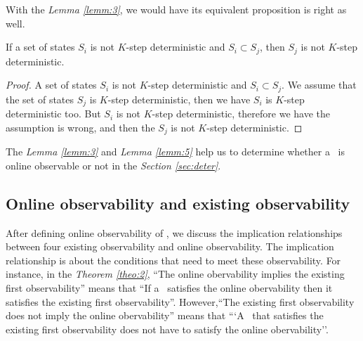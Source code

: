 With the {\em Lemma \ref{lemm:3}}, we would have its equivalent proposition is right as well.
\begin{lemma}
 If a set of states $S_i$ is not $K$-step deterministic and $S_i\subset S_j$, then $S_j$ is not $K$-step deterministic. 
  \label{lemm:5}
\end{lemma}
\begin{proof}
A set of states $S_i$ is not $K$-step deterministic and $S_i\subset S_j$. We assume that the set of states $S_j$ is $K$-step deterministic, then we have $S_i$ is $K$-step deterministic too. But $S_i$ is not $K$-step deterministic, therefore we have the assumption is wrong, and then the $S_j$ is not $K$-step deterministic.
\end{proof}

The {\em Lemma \ref{lemm:3}} and {\em Lemma \ref{lemm:5}} help us to determine whether a \BCN\ is online observable or not in the {\em Section \ref{sec:deter}}.
\subsection{Online observability and existing observability}
After defining online observability of \BCNs, we discuss the implication relationships between four existing observability and online observability. The implication relationship is about the conditions that need to meet these observability. For instance, in the {\em Theorem \ref{theo:2}}, ``The online obervability implies the existing first observability'' means that ``If a \BCN\ satisfies the online obervability then it satisfies the existing first observability''. However,``The existing first observability does not imply the online obervability'' means that ```A \BCN\ that satisfies the existing first observability does not have to satisfy the online obervability''.


